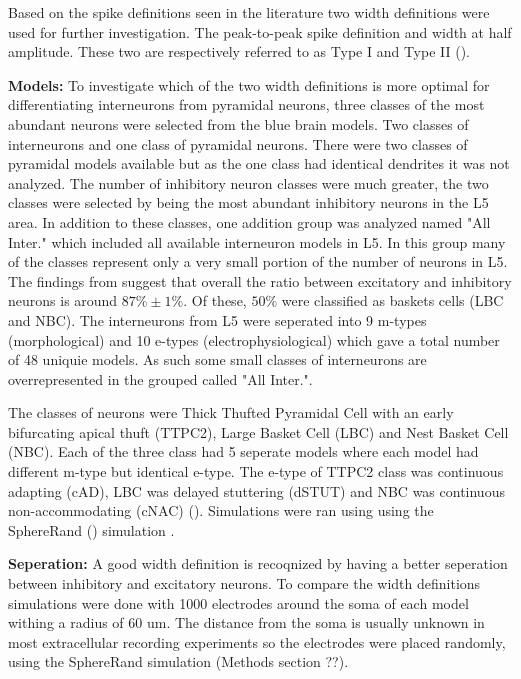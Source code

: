 \documentclass[altfont, fleqn]{uiophd}
\renewcommand{\cref}[1]{{\color{viridis_03}\mycref{#1}}}
\begin{document}
Based on the spike definitions seen in the literature
two width definitions were used for further investigation. 
The peak-to-peak spike definition and 
width at half amplitude.
These two are 
respectively referred to as Type I and Type II
(\cref{fig:4_2_width_def}).
\newline


\noindent
\textbf{Models:}
To investigate which of the two 
width definitions is more optimal for differentiating
interneurons from pyramidal neurons,
three classes of the most abundant neurons were selected 
from the blue brain models.
Two classes of interneurons and one class of pyramidal neurons. 
There were two classes of pyramidal models available but as the
one class had identical dendrites it was not analyzed.
The number of inhibitory neuron classes were much greater,
the two classes were selected by being the most abundant 
inhibitory neurons in the L5 area.
In addition to these classes, one addition group
was analyzed named "All Inter." 
which included all available interneuron
models in L5.
In this group many of the classes represent only
a very small portion of the number of neurons in L5. 
The findings from 
\textcite{markram_reconstruction_2015} 
suggest
that overall the ratio between excitatory
and inhibitory neurons is around $87\% \pm 1\%$. 
Of these, $50\%$ were classified as 
baskets cells (LBC and NBC).
The interneurons from L5 were seperated into 
9 m-types (morphological) and 10 e-types (electrophysiological)
which gave a total number
of 48 uniquie models.
As such some small classes of 
interneurons are overrepresented in the grouped called "All Inter.".

The classes of neurons were Thick Thufted Pyramidal Cell with
an early bifurcating apical thuft (TTPC2), Large Basket Cell (LBC) and
Nest Basket Cell (NBC).
Each of the three class had 5 seperate models where each model
had different m-type but identical e-type.
The e-type of TTPC2 class was continuous adapting (cAD), 
LBC was delayed stuttering (dSTUT) 
and NBC was continuous non-accommodating (cNAC) 
(\textcite[463]{markram_reconstruction_2015}).
Simulations were ran using using the
SphereRand (\cref{sec:simulation_list}) simulation .
\newline

\noindent
\textbf{Seperation:}
A good width definition is recoqnized by having a better
seperation between inhibitory
and excitatory neurons.
To compare the width definitions simulations were done 
with 1000 electrodes around the soma of each model withing 
a radius of 60 um.
The distance from the soma is usually unknown in most extracellular 
recording experiments so the electrodes were placed randomly,
using the SphereRand simulation (Methods section ??). 
\end{document}
